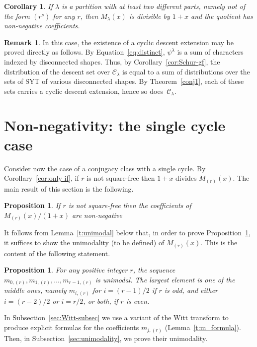 \documentclass[10pt]{article}
\newtheorem{proposition}[theorem]{Proposition}
\newtheorem{corollary}[theorem]{Corollary}
\theoremstyle{definition}
\newtheorem{remark}[theorem]{Remark}
\newcommand{\C}{\mathcal C}
\begin{document}
\begin{corollary}
    If $\lambda$ is a partition with at least two different parts, namely not of the form $(r^s)$ for any $r$, 
    then $M_\lambda(x)$ is divisible by $1+x$ and the quotient has non-negative coefficients.
\end{corollary}

\begin{remark}\label{rem:distinct} 
    In this case, the existence of a cyclic descent extension
    may be proved directly as follows.
    By Equation~\eqref{eq:distinct}, $\psi^\lambda$ is a sum of characters indexed by disconnected shapes. 
    Thus, by 
    Corollary~\ref{cor:Schur-gf}, the distribution of the descent set over $\C_\lambda$ is equal to a sum of distributions over the sets of SYT of various disconnected shapes.
    By Theorem~\ref{conj1}, each of these sets carries a cyclic descent extension, hence so does~$\C_\lambda$.
\end{remark}


\section{Non-negativity: the single cycle case}
\label{sec:cycles}

Consider now the case of a conjugacy class with a single cycle.
By Corollary~\ref{cor:only if}, if $r$ is not square-free then $1+x$ divides $M_{(r)}(x)$. 
The main result of this section is the following. 

\begin{proposition}\label{prop:cycles_nonnegativity}
    If $r$ is not square-free then the coefficients of $M_{(r)}(x)/(1+x)$ are non-negative
\end{proposition}
		
It follows from Lemma~\ref{t:unimodal} below that, in order to prove Proposition~\ref{prop:cycles_nonnegativity}, it suffices to show the unimodality (to be defined) of $M_{(r)}(x)$. This is the content of the following statement.
		 
\begin{proposition}\label{prop:s=1_unimodal}
    For any positive integer $r$, the sequence $m_{0,(r)}, m_{1,(r)},\ldots, m_{r-1,(r)}$ is unimodal.
    The largest element is one of the middle ones, namely $m_{i,(r)}$ for $i = (r-1)/2$ if $r$ is odd, and either $i = (r-2)/2$ or $i = r/2$, or both, if $r$ is even.
\end{proposition}

In Subsection~\ref{sec:Witt-subsec} we use a variant of the Witt transform to produce explicit formulas for the coefficients $m_{j,(r)}$ (Lemma~\ref{t:m_formula}).
Then, in Subsection~\ref{sec:unimodality}, we prove their unimodality.
\end{document}
